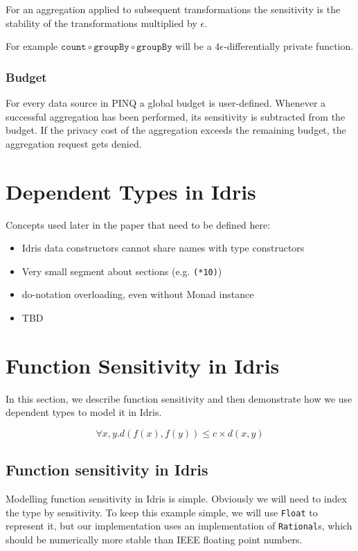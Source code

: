 \documentclass[12pt]{article}
\begin{document}
For an aggregation applied to subsequent transformations the sensitivity is the stability of the transformations multiplied by $\epsilon$.

For example $\texttt{count} \circ \texttt{groupBy} \circ \texttt{groupBy}$ will be a $4\epsilon$-differentially private function.

\subsubsection{Budget}

For every data source in PINQ a global budget is user-defined.
Whenever a successful aggregation has been performed, its sensitivity is subtracted from the budget.
If the privacy cost of the aggregation exceeds the remaining budget, the aggregation request gets denied.

\section{Dependent Types in Idris}\label{sec:dependent_types_in_idris}

Concepts used later in the paper that need to be defined here:
\begin{itemize}
\item Idris data constructors cannot share names with type constructors
\item Very small segment about sections (e.g. \texttt{(*10)})
\item do-notation overloading, even without Monad instance
\item TBD
\end{itemize}

\section{Function Sensitivity in Idris}\label{sec:function_sensitivity}

In this section, we describe function sensitivity and then demonstrate how we use dependent types to model it in Idris.

	$$ \forall x,y. d(f(x),f(y)) \le c \times d(x,y) $$


\subsection{Function sensitivity in Idris}

Modelling function sensitivity in Idris is simple.
Obviously we will need to index the type by sensitivity.
To keep this example simple, we will use \texttt{Float} to represent it, but our implementation uses an implementation of \texttt{Rational}s, which should be numerically more stable than IEEE floating point numbers.
\end{document}

